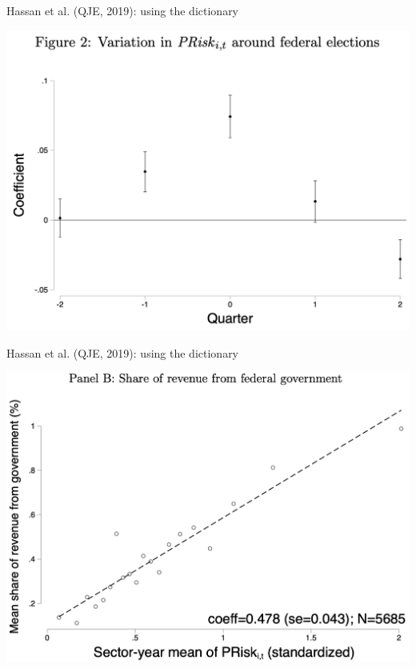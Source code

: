 \documentclass[english]{beamer}
\begin{document}
\begin{frame}{Hassan et al. (QJE, 2019): using the dictionary}
\vspace{-7pt}
\begin{center}
\includegraphics[scale=0.35]{Images/hassan_new2.png}
\end{center}
\end{frame}

\begin{frame}{Hassan et al. (QJE, 2019): using the dictionary}
\vspace{-7pt}
\begin{center}
\includegraphics[scale=0.35]{Images/hassan_new3.png}
\end{center}
\end{frame}
\end{document}
